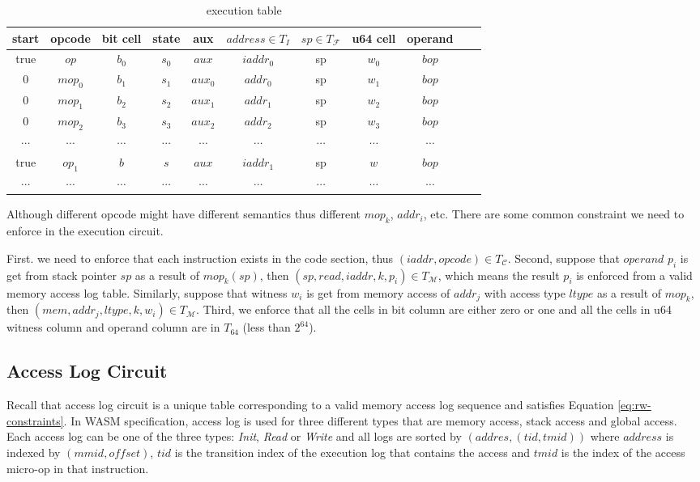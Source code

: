 \begin{table}[!h]
\begin{center}
\begin{tabular}{ | c | c | c | c | c | c | c | c | c | c | c | }
  \hline
  start & opcode & bit cell & state & aux & $address \in T_{I}$ & $sp \in T_\mathcal{F}$& u64 cell & operand \\ 
  \hline
   true & $op$ & $b_0$ & $s_0$ & $aux$ & $iaddr_0$ & sp & $w_0$ & $bop$\\ 
 \hline
   0 & $mop_0$ & $b_1$ & $s_1$ & $aux_0$ & $addr_0$ & sp & $w_1$ & $bop$\\ 
 \hline
   0 & $mop_1$ & $b_2$ & $s_2$ & $aux_1$ & $addr_1$ & sp & $w_2$ & $bop$\\ 
 \hline 
  0 & $mop_2$ & $b_3$ & $s_3$ & $aux_2$ & $addr_2$ & sp & $w_3$ & $bop$\\ 
 \hline
   $\cdots$ & $\cdots$ & $\cdots$ & $\cdots$ & $\cdots$ & $\cdots$ & $\cdots$ & $\cdots$ & $\cdots$\\ 
 \hline
   true & $op_1$ & $b$ & $s$ & $aux$ & $iaddr_1$ & sp & $w$ & $bop$\\ 
 \hline
   $\cdots$ & $\cdots$ & $\cdots$ & $\cdots$ & $\cdots$ & $\cdots$ & $\cdots$ & $\cdots$ & $\cdots$\\
 \hline
 \hline
\end{tabular}
\caption{execution table}
\label{tbl:ex-table}
\end{center}
\end{table}

Although different opcode might have different semantics thus different $mop_k$, $addr_i$, etc. There are some common constraint we need to enforce in the execution circuit.

First. we need to enforce that each instruction exists in the code section, thus $(iaddr, opcode) \in T_\mathcal{C}$. Second, suppose that $operand$ $p_i$ is get from stack pointer $sp$ as a result of $mop_k(sp)$, then $(sp, read, iaddr, k, p_i) \in T_{\mathcal{M}}$, which means the result $p_i$ is enforced from a valid memory access log table. Similarly, suppose that witness $w_i$ is get from memory access of $addr_j$ with access type $ltype$ as a result of $mop_k$, then $(mem, addr_j, ltype, k, w_i) \in T_{\mathcal{M}}$.  Third, we enforce that all the cells in bit column are either zero or one and all the cells in u64 witness column and operand column are in $T_64$ (less than $2^{64}$).
\subsection{Access Log Circuit}
\label{chp:access-log-circuit}
Recall that access log circuit is a unique table corresponding to a valid memory access log sequence and satisfies Equation \ref{eq:rw-constraints}. In WASM specification, access log is used for three different types that are memory access, stack access and global access. Each access log can be one of the three types: \emph{Init}, \emph{Read} or \emph{Write} and all logs are sorted by $(addres, (tid, tmid))$ where $address$ is indexed by $ (mmid, offset)$, $tid$ is the transition index of the execution log that contains the access and $tmid$ is the index of the access micro-op in that instruction.

